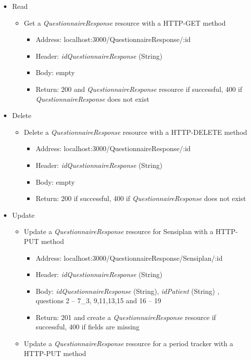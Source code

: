 \documentclass[
a4paper,
11pt
]{article}
\begin{document}
\begin{itemize}
	\newpage
		\item Read
		\begin{itemize}
			\item Get a \textit{QuestionnaireResponse} resource with a \ac{HTTP}-GET method
			\begin{itemize}
				\item Address: localhost:3000/QuestionnaireResponse/:id
				\item Header: \textit{idQuestionnaireResponse} (String)
				\item Body: empty
				\item Return: 200 and \textit{QuestionnaireResponse} resource if successful, 400 if \textit{QuestionnaireResponse} does not exist
			\end{itemize}
		\end{itemize}
		\item Delete
		\begin{itemize}
			\item Delete a \textit{QuestionnaireResponse} resource with a \ac{HTTP}-DELETE method
			\begin{itemize}
				\item Address: localhost:3000/QuestionnaireResponse/:id
				\item Header: \textit{idQuestionnaireResponse} (String)
				\item Body: empty
				\item Return: 200 if successful, 400 if \textit{QuestionnaireResponse} does not exist
			\end{itemize}
		\end{itemize}
		\item Update
		\begin{itemize}
			\item Update a \textit{QuestionnaireResponse} resource for Sensiplan\textsuperscript{\textcopyright} with a \ac{HTTP}-PUT method
			\begin{itemize}
				\item Address: localhost:3000/QuestionnaireResponse/Sensiplan/:id
				\item Header: \textit{idQuestionnaireResponse} (String)
				\item Body: \textit{idQuestionnaireResponse} (String), \textit{idPatient} (String) , questions 2 – 7\_3, 9,11,13,15 and 16 – 19
				\item Return: 201 and create a \textit{QuestionnaireResponse} resource if successful, 400 if fields are missing
			\end{itemize}
			\item Update a \textit{QuestionnaireResponse} resource for a period tracker with a \ac{HTTP}-PUT method        \begin{itemize}

\end{itemize}
\end{itemize}
\end{itemize}
\end{document}
